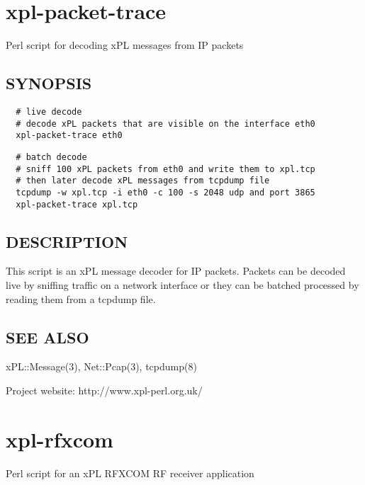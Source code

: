 \documentclass[12pt,a4paper]{article}
\begin{document}
\newpage
\section{xpl-packet-trace\label{xpl-packet-trace}}


Perl script for decoding xPL messages from IP packets

\subsection*{SYNOPSIS\label{xpl-packet-trace_SYNOPSIS}}
\begin{verbatim}
  # live decode
  # decode xPL packets that are visible on the interface eth0
  xpl-packet-trace eth0
\end{verbatim}
\begin{verbatim}
  # batch decode
  # sniff 100 xPL packets from eth0 and write them to xpl.tcp
  # then later decode xPL messages from tcpdump file
  tcpdump -w xpl.tcp -i eth0 -c 100 -s 2048 udp and port 3865
  xpl-packet-trace xpl.tcp
\end{verbatim}
\subsection*{DESCRIPTION\label{xpl-packet-trace_DESCRIPTION}}


This script is an xPL message decoder for IP packets.  Packets can be
decoded live by sniffing traffic on a network interface or they can be
batched processed by reading them from a tcpdump file.

\subsection*{SEE ALSO\label{xpl-packet-trace_SEE_ALSO}}


xPL::Message(3), Net::Pcap(3), tcpdump(8)



Project website: http://www.xpl-perl.org.uk/

\newpage
\section{xpl-rfxcom\label{xpl-rfxcom}}


Perl script for an xPL RFXCOM RF receiver application
\end{document}
